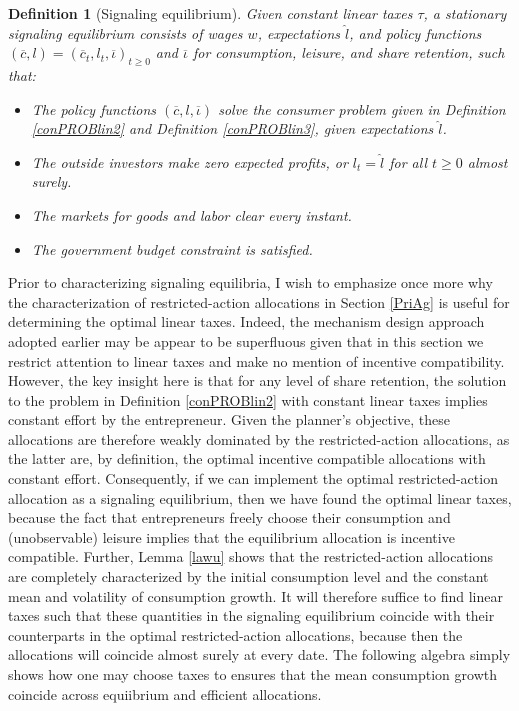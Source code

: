 \documentclass[11pt]{article}
\theoremstyle{plain}
\newtheorem{defn}{Definition}[section]
\begin{document}
\begin{defn}[Signaling equilibrium] \label{SIGE}
Given constant linear taxes $\tau$, a stationary signaling equilibrium consists of wages $w$, expectations $\hat{l}$, and policy functions $(\overline{c},l) = (\overline{c}_t,l_t,\overline{\iota})_{t\geq0}$ and $\overline{\iota}$ for consumption, leisure, and share retention, such that:
\begin{itemize}
\item The policy functions $(\overline{c},l,\overline{\iota})$ solve the consumer problem given in Definition \ref{conPROBlin2} and Definition \ref{conPROBlin3}, given expectations $\hat{l}$.  
\item The outside investors make zero expected profits, or $l_t = \hat{l}$ for all $t\geq0$ almost surely. 
\item The markets for goods and labor clear every instant. 
\item The government budget constraint is satisfied. 
\end{itemize}
\end{defn} 

Prior to characterizing signaling equilibria, I wish to emphasize once more why the characterization of restricted-action allocations in Section \ref{PriAg} is useful for determining the optimal linear taxes. Indeed, the mechanism design approach adopted earlier may be appear to be superfluous given that in this section we restrict attention to linear taxes and make no mention of incentive compatibility. However, the key insight here is that for any level of share retention, the solution to the problem in Definition \ref{conPROBlin2} with constant linear taxes implies constant effort by the entrepreneur. Given the planner's objective, these allocations are therefore weakly dominated by the restricted-action allocations, as the latter are, by definition, the optimal incentive compatible allocations with constant effort. Consequently, if we can implement the optimal restricted-action allocation as a signaling equilibrium, then we have found the optimal linear taxes, because the fact that entrepreneurs freely choose their consumption and (unobservable) leisure implies that the equilibrium allocation is incentive compatible. Further, Lemma \ref{lawu} shows that the restricted-action allocations are completely characterized by the initial consumption level and the constant mean and volatility of consumption growth. It will therefore suffice to find linear taxes such that these quantities in the signaling equilibrium coincide with their counterparts in the optimal restricted-action allocations, because then the allocations will coincide almost surely at every date. The following algebra simply shows how one may choose taxes to ensures that the mean consumption growth coincide across equiibrium and efficient allocations. 
\end{document}
